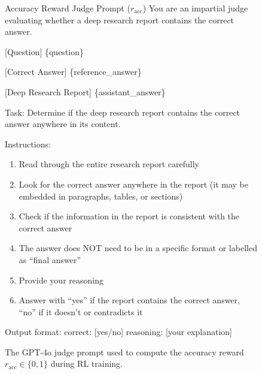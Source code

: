 \setcounter{figure}{7}
\begin{figure}[H]
\centering
\begin{promptbox}[prompttea]{Accuracy Reward Judge Prompt ($r_{\mathrm{acc}}$)}
You are an impartial judge evaluating whether a deep research report contains the correct answer.

[Question]
\{question\}

[Correct Answer]
\{reference\_answer\}

[Deep Research Report]
\{assistant\_answer\}

Task: Determine if the deep research report contains the correct answer anywhere in its content.

Instructions:
\begin{enumerate}[leftmargin=*,nosep]
\item Read through the entire research report carefully
\item Look for the correct answer anywhere in the report (it may be embedded in paragraphs, tables, or sections)
\item Check if the information in the report is consistent with the correct answer
\item The answer does NOT need to be in a specific format or labelled as ``final answer''
\item Provide your reasoning
\item Answer with ``yes'' if the report contains the correct answer, ``no'' if it doesn't or contradicts it
\end{enumerate}

Output format:
correct: [yes/no]
reasoning: [your explanation]
\end{promptbox}
\caption{The GPT-4o judge prompt used to compute the accuracy reward $r_{\text{acc}} \in \{0,1\}$ during RL training.}
\label{apdxfig:acc-judge}
\end{figure}


